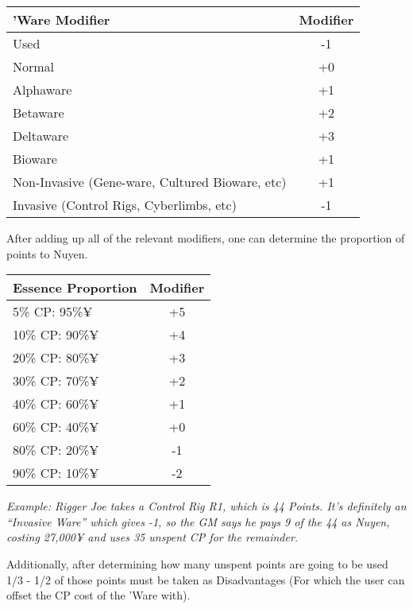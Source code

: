 \begin{multicols*}{3}
	\vspace{8\baselineskip}
	\begin{center}
		\begin{tabularx}{0.50\textwidth}{|X|c|}
			\hline
			\textbf{'Ware Modifier} & \textbf{Modifier}\\
			\hline \hline
			Used & -1\\
			Normal & +0\\
			\hline
			Alphaware & +1\\
			Betaware & +2\\
			Deltaware & +3\\
			\hline
			Bioware & +1\\
			\hline
			Non-Invasive (Gene-ware, Cultured Bioware, etc) & +1\\
			Invasive (Control Rigs, Cyberlimbs, etc) & -1\\
			\hline
		\end{tabularx}
	\end{center}
	
	After adding up all of the relevant modifiers, one can determine the proportion of points to Nuyen.
	
	\begin{center}
		\begin{tabularx}{0.32\textwidth}{|X|c|}
			\hline
			\textbf{Essence Proportion} & \textbf{Modifier}\\
			\hline \hline
			5\% CP: 95\%¥ & +5\\
			\hline
			10\% CP: 90\%¥ & +4\\
			\hline
			20\% CP: 80\%¥ & +3\\
			\hline
			30\% CP: 70\%¥ & +2\\
			\hline
			40\% CP: 60\%¥ & +1\\
			\hline
			60\% CP: 40\%¥ & +0\\
			\hline
			80\% CP: 20\%¥ & -1\\
			\hline
			90\% CP: 10\%¥ & -2\\
			\hline
		\end{tabularx}
	\end{center}
	
	\textit{\textcolor{OliveGreen}{Example: Rigger Joe takes a Control Rig R1, which is 44 Points. It’s definitely an “Invasive Ware” which gives -1, so the GM says he pays 9 of the 44 as Nuyen, costing 27,000¥ and uses 35 unspent CP for the remainder. }}
	
	Additionally, after determining how many unspent points are going to be used 1/3 - 1/2 of those points must be taken as Disadvantages (For which the user can offset the CP cost of the 'Ware with). 
	

\end{multicols*}
